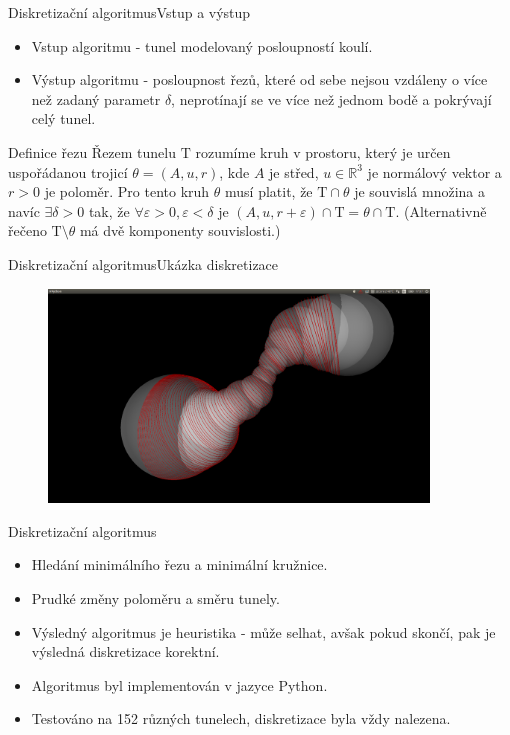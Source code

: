 \documentclass{beamer}
\newcommand{\Rbb}{\mathbb{R}}
\newcommand{\Tau}{\mathrm{T}}
\begin{document}
\begin{frame}{Diskretizační algoritmus}{Vstup a výstup}
\begin{itemize}
	\item Vstup algoritmu - tunel modelovaný posloupností koulí.
	\item Výstup algoritmu - posloupnost řezů, které od sebe nejsou vzdáleny o více než zadaný parametr $ \delta $, neprotínají se ve více než jednom bodě a pokrývají celý tunel.
\end{itemize}

\begin{block}{Definice řezu}
Řezem tunelu $ \Tau $ rozumíme kruh v prostoru, který je určen uspořádanou trojicí
$\theta = (A, u, r)$, kde $ A $ je střed, $ u \in \Rbb^3 $ je normálový vektor a $ r > 0 $ je poloměr.
Pro tento kruh $ \theta $ musí platit, že $ \Tau \cap \theta $ je souvislá množina a navíc
$ \exists \delta > 0 $ tak, že $ \forall \varepsilon > 0,  \varepsilon < \delta $ je
$ (A, u, r + \varepsilon) \cap \Tau = \theta \cap \Tau $.
(Alternativně řečeno $\Tau \setminus \theta $ má dvě komponenty souvislosti.)
\end{block}

\end{frame}

\begin{frame}{Diskretizační algoritmus}{Ukázka diskretizace}
    \begin{figure}
        \includegraphics[width=0.9\textwidth]{img/weighted_dir.png}
    \end{figure}
\end{frame}

\begin{frame}{Diskretizační algoritmus}
    \begin{itemize}
	\item Hledání minimálního řezu a minimální kružnice.
	\item Prudké změny poloměru a směru tunely.
	\item Výsledný algoritmus je heuristika - může selhat, avšak pokud skončí, pak je výsledná diskretizace korektní.
	\item Algoritmus byl implementován v jazyce Python.
	\item Testováno na 152 různých tunelech, diskretizace byla vždy nalezena.
	\end{itemize}
\end{frame}
\end{document}
